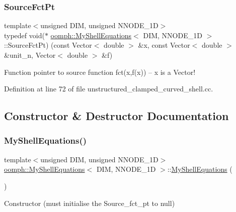 \subsubsection{\texorpdfstring{Source\+Fct\+Pt}{SourceFctPt}}
{\footnotesize\ttfamily template$<$unsigned D\+IM, unsigned N\+N\+O\+D\+E\+\_\+1D$>$ \\
typedef void($\ast$ \hyperlink{classoomph_1_1MyShellEquations}{oomph\+::\+My\+Shell\+Equations}$<$ D\+IM, N\+N\+O\+D\+E\+\_\+1D $>$\+::Source\+Fct\+Pt) (const Vector$<$ double $>$ \&x, const Vector$<$ double $>$ \&unit\+\_\+n, Vector$<$ double $>$ \&f)}



Function pointer to source function fct(x,f(x)) -- x is a Vector! 



Definition at line 72 of file unstructured\+\_\+clamped\+\_\+curved\+\_\+shell.\+cc.



\subsection{Constructor \& Destructor Documentation}
\mbox{\label{classoomph_1_1MyShellEquations_a4d459716fb0b2b66ece7d87c0feac9ed}} 
\subsubsection{\texorpdfstring{My\+Shell\+Equations()}{MyShellEquations()}\hspace{0.1cm}{\footnotesize\ttfamily [1/2]}}
{\footnotesize\ttfamily template$<$unsigned D\+IM, unsigned N\+N\+O\+D\+E\+\_\+1D$>$ \\
\hyperlink{classoomph_1_1MyShellEquations}{oomph\+::\+My\+Shell\+Equations}$<$ D\+IM, N\+N\+O\+D\+E\+\_\+1D $>$\+::\hyperlink{classoomph_1_1MyShellEquations}{My\+Shell\+Equations} (\begin{DoxyParamCaption}{ }\end{DoxyParamCaption})\hspace{0.3cm}{\ttfamily [inline]}}



Constructor (must initialise the Source\+\_\+fct\+\_\+pt to null) 



